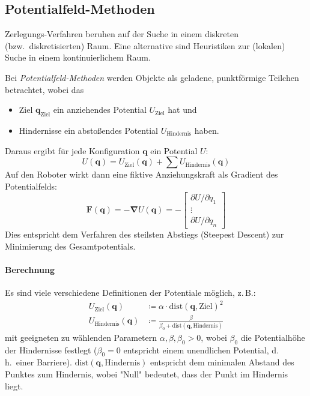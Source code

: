 \documentclass[a4paper, 11pt, accentcolor = tud3b]{tudreport}
\renewcommand{\vec}[1]{\boldsymbol{\mathbf{#1}}}
\renewcommand{\dh}{d.\,h.~}
\newcommand{\bzw}{bzw.~}
\begin{document}
			\subsection{Potentialfeld-Methoden} %
				Zerlegungs-Verfahren beruhen auf der Suche in einem diskreten (\bzw diskretisierten) Raum. Eine alternative sind Heuristiken zur (lokalen) Suche in einem kontinuierlichem Raum.
				
				Bei \emph{Potentialfeld-Methoden} werden Objekte als geladene, punktförmige Teilchen betrachtet, wobei das
				\begin{itemize}
					\item Ziel \( \vec{q}_\text{Ziel} \) ein anziehendes Potential \( U_\text{Ziel} \) hat und
					\item Hindernisse ein abstoßendes Potential \( U_\text{Hindernis} \) haben.
				\end{itemize}
				Daraus ergibt für jede Konfiguration \( \vec{q} \) ein Potential \(U\):
				\begin{equation*}
					U(\vec{q}) = U_\text{Ziel}(\vec{q}) + \sum U_\text{Hindernis}(\vec{q})
				\end{equation*}
				Auf den Roboter wirkt dann eine fiktive Anziehungskraft als Gradient des Potentialfelds:
				\begin{equation*}
					\vec{F}(\vec{q}) = -\vec{\nabla} U(\vec{q}) =
						- \begin{bmatrix}
							\partial U / \partial q_1 \\
							\vdots \\
							\partial U / \partial q_n
						\end{bmatrix}
				\end{equation*}
				Dies entspricht dem Verfahren des steilsten Abstiegs (Steepest Descent) zur Minimierung des Gesamtpotentials.
				
				\paragraph{Berechnung}
					Es sind viele verschiedene Definitionen der Potentiale möglich, z.\,B.:
					\begin{align*}
						U_\text{Ziel}(\vec{q}) &\coloneqq \alpha \cdot \text{dist}(\vec{q}, \text{Ziel})^2 \\
						U_\text{Hindernis}(\vec{q}) &\coloneqq \frac{\beta}{\beta_0 + \text{dist}(\vec{q}, \text{Hindernis})}
					\end{align*}
					mit geeigneten zu wählenden Parametern \( \alpha, \beta, \beta_0 > 0 \), wobei \( \beta_0 \) die Potentialhöhe der Hindernisse festlegt (\( \beta_0 = 0 \) entspricht einem unendlichen Potential, \dh einer Barriere). \( \text{dist}(\vec{q}, \text{Hindernis}) \) entspricht dem minimalen Abstand des Punktes zum Hindernis, wobei "Null" bedeutet, dass der Punkt im Hindernis liegt.
					
\end{document}
